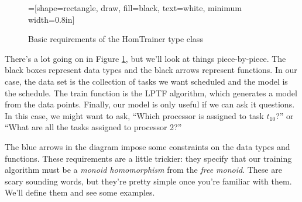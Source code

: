 \documentclass[tikz]{tmr}
\newcommand\h{\lstinline}
\newcommand\+{\mdoubleplus}
\begin{document}
\begin{figure}[H]
\caption{Basic requirements of the HomTrainer type class}
\label{fig:HomTrainer}
\centering
{}=[shape=rectangle, draw, fill=black, text=white, minimum width=0.8in]
\vspace{0.15in}
\end{figure}

There's a lot going on in Figure \ref{fig:HomTrainer}, but we'll look at things piece-by-piece.
The black boxes represent data types and the black arrows represent functions.
In our case, the data set is the collection of tasks we want scheduled and the model is the schedule.
The train function is the LPTF algorithm, which generates a model from the data points.
Finally, our model is only useful if we can ask it questions.
In this case, we might want to ask, ``Which processor is assigned to task $t_{10}$?'' or ``What are all the tasks assigned to processor 2?''

The blue arrows in the diagram impose some constraints on the data types and functions. These requirements
are a little trickier:
they specify that our training algorithm must be a \emph{monoid homomorphism} from the \emph{free monoid}.
These are scary sounding words, but they're pretty simple once you're familiar with them.
We'll define them and see some examples.
\end{document}
